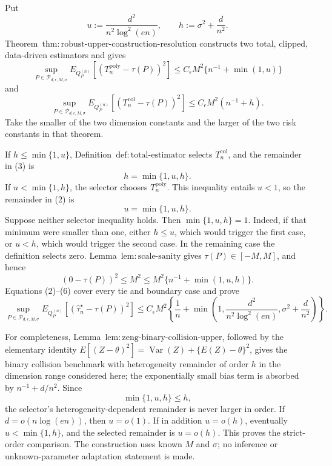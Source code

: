 Put
\[
 u:=\frac{d^2}{n^2\log^2(en)},\qquad h:=\sigma^2+\frac d{n^2}.
\tag{1}
\]
Theorem~\(\mathrm{thm:robust\text{-}upper\text{-}construction\text{-}resolution}\) constructs two total, clipped, data-driven estimators and gives
\[
 \sup_{P\in\mathcal P_{d,\epsilon,M,\sigma}}
 E_{Q_P^{(n)}}[(T_n^{\mathrm{poly}}-\tau(P))^2]
 \le C_\epsilon M^2\{n^{-1}+\min(1,u)\}
\tag{2}
\]
and
\[
 \sup_{P\in\mathcal P_{d,\epsilon,M,\sigma}}
 E_{Q_P^{(n)}}[(T_n^{\mathrm{col}}-\tau(P))^2]
 \le C_\epsilon M^2(n^{-1}+h).
\tag{3}
\]
Take the smaller of the two dimension constants and the larger of the two risk constants in that theorem.

If \(h\le\min\{1,u\}\), Definition~\(\mathrm{def:total\text{-}estimator}\) selects \(T_n^{\mathrm{col}}\), and the remainder in (3) is
\[
 h=\min\{1,u,h\}.
\tag{4}
\]
If \(u<\min\{1,h\}\), the selector chooses \(T_n^{\mathrm{poly}}\).  This inequality entails \(u<1\), so the remainder in (2) is
\[
 u=\min\{1,u,h\}.
\tag{5}
\]
Suppose neither selector inequality holds.  Then \(\min\{1,u,h\}=1\).  Indeed, if that minimum were smaller than one, either \(h\le u\), which would trigger the first case, or \(u<h\), which would trigger the second case.  In the remaining case the definition selects zero.  Lemma~\(\mathrm{lem:scale\text{-}sanity}\) gives \(\tau(P)\in[-M,M]\), and hence
\[
 (0-\tau(P))^2\le M^2
 \le M^2\{n^{-1}+\min(1,u,h)\}.
\tag{6}
\]
Equations (2)--(6) cover every tie and boundary case and prove
\[
 \sup_{P\in\mathcal P_{d,\epsilon,M,\sigma}}
 E_{Q_P^{(n)}}[(\widehat\tau_n^\star-\tau(P))^2]
 \le C_\epsilon M^2\left\{\frac1n+
 \min\left(1,\frac{d^2}{n^2\log^2(en)},\sigma^2+\frac d{n^2}\right)\right\}.
\tag{7}
\]

For completeness, Lemma~\(\mathrm{lem:zeng\text{-}binary\text{-}collision\text{-}upper}\), followed by the elementary identity \(E[(Z-\theta)^2]=\operatorname{Var}(Z)+\{E(Z)-\theta\}^2\), gives the binary collision benchmark with heterogeneity remainder of order \(h\) in the dimension range considered here; the exponentially small bias term is absorbed by \(n^{-1}+d/n^2\).  Since
\[
 \min\{1,u,h\}\le h,
\tag{8}
\]
the selector's heterogeneity-dependent remainder is never larger in order.  If \(d=o(n\log(en))\), then \(u=o(1)\).  If in addition \(u=o(h)\), eventually \(u<\min\{1,h\}\), and the selected remainder is \(u=o(h)\).  This proves the strict-order comparison.  The construction uses known \(M\) and \(\sigma\); no inference or unknown-parameter adaptation statement is made.